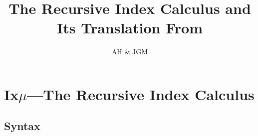 \documentclass[12pt]{article}
\title{The Recursive Index Calculus and Its Translation From \RO}
\author{AH \& JGM}
\begin{document}
\maketitle


\section{Ix$\mu$---The Recursive Index Calculus}
\label{sec:Introduction}

\subsection{Syntax}
\label{sec:Syntax}







\end{document}
